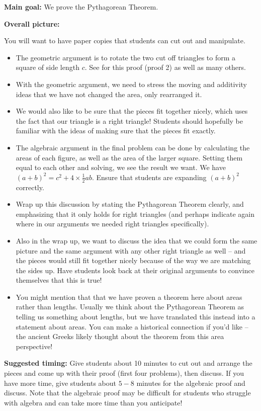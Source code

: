 \documentclass[nooutcomes,noauthor, handout]{ximera}
\begin{document}
\begin{instructorNotes} 



{\bf Main goal:} We prove the Pythagorean Theorem.

{\bf Overall picture:}


You will want to have paper copies that students can cut out and manipulate.
\begin{itemize}
	\item The geometric argument is to rotate the two cut off triangles to form a square of side length $c$. See  for this proof (proof 2) as well as many others.
	\item With the geometric argument, we need to stress the moving and additivity ideas that we have not changed the area, only rearranged it.
	\item We would also like to be sure that the pieces fit together nicely, which uses the fact that our triangle is a right triangle! Students should hopefully be familiar with the ideas of making sure that the pieces fit exactly.
	\item The algebraic argument in the final problem can be done by calculating the areas of each figure, as well as the area of the larger square. Setting them equal to each other and solving, we see the result we want. We have $(a+b)^2 = c^2 + 4 \times \frac{1}{2}ab$. Ensure that students are expanding $(a+b)^2$ correctly.
	\item Wrap up this discussion by stating the Pythagorean Theorem clearly, and emphasizing that it only holds for right triangles (and perhaps indicate again where in our arguments we needed right triangles specifically).
	\item Also in the wrap up, we want to discuss the idea that we could form the same picture and the same argument with any other right triangle as well -- and the pieces would still fit together nicely because of the way we are matching the sides up. Have students look back at their original arguments to convince themselves that this is true!
	\item You might mention that that we have proven a theorem here about areas rather than lengths. Usually we think about the Pythagorean Theorem as telling us something about lengths, but we have translated this instead into a statement about areas. You can make a historical connection if you'd like -- the ancient Greeks likely thought about the theorem from this area perspective!
\end{itemize}






{\bf Suggested timing:} Give students about 10 minutes to cut out and arrange the pieces and come up with their proof (first four problems), then discuss. If you have more time, give students about $5-8$ minutes for the algebraic proof and discuss. Note that the algebraic proof may be difficult for students who struggle with algebra and can take more time than you anticipate!



\end{instructorNotes}
\end{document}
